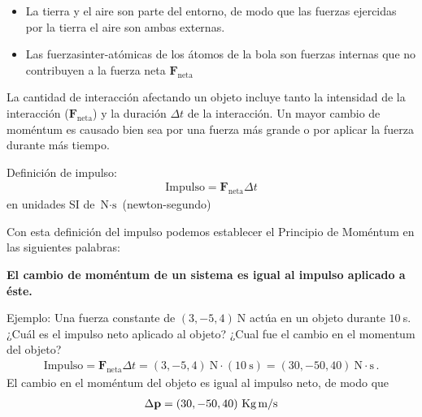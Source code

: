 \begin{frame}
\begin{itemize}
  \item     \alert{La tierra y el aire} son parte del entorno, de modo que las fuerzas
    ejercidas por la tierra el aire son ambas \alert{externas}.
  \item Las fuerzas\alert{inter-atómicas} de los átomos de la bola son
    fuerzas \alert{internas} que no contribuyen a la fuerza neta $\mathbf{F}_{\text{neta}}$
  \end{itemize}
  
\end{frame}

\begin{frame}
  La cantidad de interacción afectando un objeto incluye tanto la \alert{intensidad de la interacción} ($\mathbf{F}_{\text{neta}}$) y la \alert{duración} $\Delta t$ de la interacción. Un mayor cambio de moméntum es causado bien sea por una fuerza más grande o por aplicar la fuerza durante más tiempo.
\end{frame}

\begin{frame}
{Definición de impulso:}
\begin{align}
  \text{Impulso}=\mathbf{F}_{\text{neta}}\Delta t
\end{align}
en unidades SI de $\text{N}\cdot\text{s}$ (newton-segundo)
\end{frame}

Con esta definición del impulso podemos establecer el Principio de Moméntum en las siguientes palabras:
\begin{frame}
  \begin{center}
    \textbf{El cambio de moméntum de un sistema es igual al impulso aplicado a éste.}
  \end{center}
\end{frame}

Ejemplo: Una fuerza constante de $(3,-5,4)\ $N actúa en un objeto durante $10\ $s. ¿Cuál es el impulso neto aplicado al objeto? ¿Cual fue el cambio en el momentum del objeto?
\begin{align}
\text{Impulso}=\mathbf{F}_{\text{neta}}\Delta t=(3,-5,4)\ \text{N}\cdot (10\ \text{s})=
(30,-50,40)\ \text{N}\cdot\text{s}\,.
\end{align}
El cambio en el moméntum del objeto es igual al impulso neto, de modo que
\begin{align}
  \Delta \mathbf{p}=(30,-50,40)\ \text{Kg\,m/s}
\end{align}


